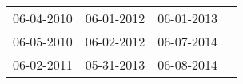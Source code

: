 \begin{supertabular}{llll}
 06-04-2010 &  06-01-2012 &  06-01-2013 \\
 06-05-2010 &  06-02-2012 &  06-07-2014 \\
 06-02-2011 &  05-31-2013 &  06-08-2014 \\
\end{supertabular}
